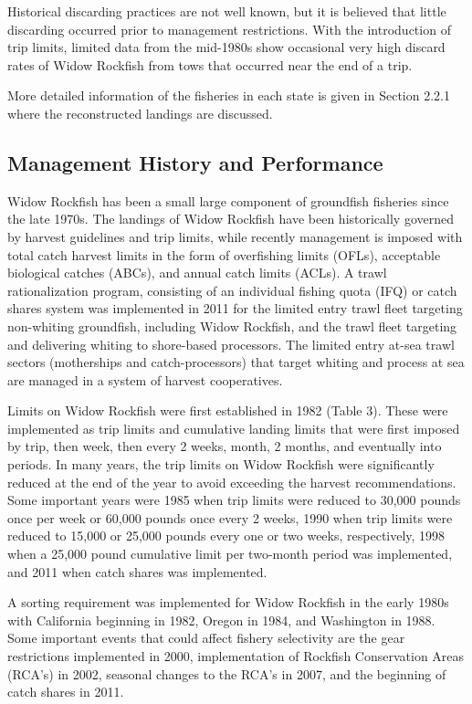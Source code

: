 \documentclass[
]{scrartcl}
\begin{document}
Historical discarding practices are not well known, but it is believed
that little discarding occurred prior to management restrictions. With
the introduction of trip limits, limited data from the mid-1980s show
occasional very high discard rates of Widow Rockfish from tows that
occurred near the end of a trip.

More detailed information of the fisheries in each state is given in
Section 2.2.1 where the reconstructed landings are discussed.

\subsection{Management History and
Performance}\label{management-history-and-performance}

Widow Rockfish has been a small large component of groundfish fisheries
since the late 1970s. The landings of Widow Rockfish have been
historically governed by harvest guidelines and trip limits, while
recently management is imposed with total catch harvest limits in the
form of overfishing limits (OFLs), acceptable biological catches (ABCs),
and annual catch limits (ACLs). A trawl rationalization program,
consisting of an individual fishing quota (IFQ) or catch shares system
was implemented in 2011 for the limited entry trawl fleet targeting
non-whiting groundfish, including Widow Rockfish, and the trawl fleet
targeting and delivering whiting to shore-based processors. The limited
entry at-sea trawl sectors (motherships and catch-processors) that
target whiting and process at sea are managed in a system of harvest
cooperatives.

Limits on Widow Rockfish were first established in 1982 (Table 3). These
were implemented as trip limits and cumulative landing limits that were
first imposed by trip, then week, then every 2 weeks, month, 2 months,
and eventually into periods. In many years, the trip limits on Widow
Rockfish were significantly reduced at the end of the year to avoid
exceeding the harvest recommendations. Some important years were 1985
when trip limits were reduced to 30,000 pounds once per week or 60,000
pounds once every 2 weeks, 1990 when trip limits were reduced to 15,000
or 25,000 pounds every one or two weeks, respectively, 1998 when a
25,000 pound cumulative limit per two-month period was implemented, and
2011 when catch shares was implemented.

A sorting requirement was implemented for Widow Rockfish in the early
1980s with California beginning in 1982, Oregon in 1984, and Washington
in 1988. Some important events that could affect fishery selectivity are
the gear restrictions implemented in 2000, implementation of Rockfish
Conservation Areas (RCA's) in 2002, seasonal changes to the RCA's in
2007, and the beginning of catch shares in 2011.
\end{document}
